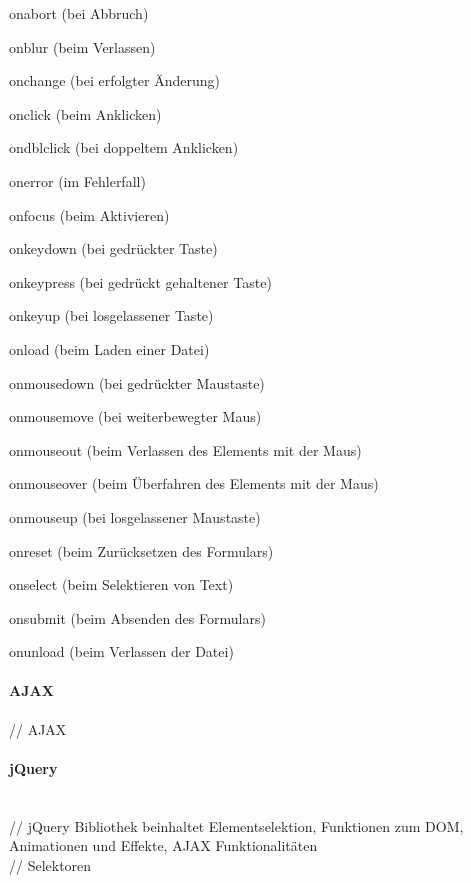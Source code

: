 \documentclass[12pt,a4paper,bibliography=totocnumbered,listof=totocnumbered]{scrartcl}
\begin{document}
    \begin{compactitem}
	    \item onabort (bei Abbruch)
	    \item onblur (beim Verlassen)
	    \item onchange (bei erfolgter Änderung)
	    \item onclick (beim Anklicken)
	    \item ondblclick (bei doppeltem Anklicken)
	    \item onerror (im Fehlerfall)
	    \item onfocus (beim Aktivieren)
	    \item onkeydown (bei gedrückter Taste)
	    \item onkeypress (bei gedrückt gehaltener Taste)
	    \item onkeyup (bei losgelassener Taste)
	    \item onload (beim Laden einer Datei)
	    \item onmousedown (bei gedrückter Maustaste)
	    \item onmousemove (bei weiterbewegter Maus)
	    \item onmouseout (beim Verlassen des Elements mit der Maus)
	    \item onmouseover (beim Überfahren des Elements mit der Maus)
	    \item onmouseup (bei losgelassener Maustaste)
	    \item onreset (beim Zurücksetzen des Formulars)
	    \item onselect (beim Selektieren von Text)
	    \item onsubmit (beim Absenden des Formulars)
	    \item onunload (beim Verlassen der Datei)
    \end{compactitem}

\paragraph{AJAX} // AJAX\\

\paragraph{jQuery}
$\;$ \\
// jQuery Bibliothek beinhaltet Elementselektion, Funktionen zum DOM, Animationen und Effekte, AJAX Funktionalitäten\\

// Selektoren\\
\end{document}
